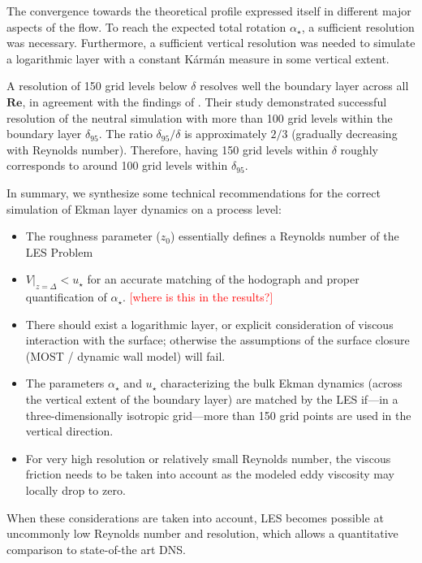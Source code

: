 \documentclass[a4paper,11pt]{article}
\newcommand{\todo}[1]{\textcolor{red}{$[$#1$]$}}
\newcommand{\RE}{\mathbf{Re}}
\begin{document}
The convergence towards the theoretical profile expressed itself in different major aspects of the flow. To reach the expected total rotation $\alpha_\star$, a sufficient resolution was necessary. Furthermore, a sufficient vertical resolution was needed to simulate a logarithmic layer with a constant K\'arm\'an measure in some vertical extent.

A resolution of 150 grid levels below $\delta$ resolves well the boundary layer across all $\RE$, in agreement with the findings of \cite{wurps2020grid}. Their study demonstrated successful resolution of the neutral simulation with more than 100 grid levels within the boundary layer $\delta_{95}$. The ratio $\delta_{95}/\delta$ is approximately $2/3$ (gradually decreasing with Reynolds number). Therefore, having 150 grid levels within $\delta$ roughly corresponds to around 100 grid levels within $\delta_{95}$.

In summary, we synthesize some technical recommendations for the correct simulation of Ekman layer dynamics on a process level:
\begin{itemize}
\item The roughness parameter ($z_0$) essentially defines a Reynolds number of the LES Problem
\item $V|_{z=\Delta} < u_\star$ for an accurate matching of the hodograph and proper quantification of $\alpha_\star$. \todo{where is this in the results?}
\item There should exist a logarithmic layer, or explicit consideration of viscous interaction with the surface; otherwise the assumptions of the surface closure (MOST / dynamic wall model) will fail.
\item The parameters $\alpha_\star$ and $u_\star$ characterizing the bulk Ekman dynamics (across the vertical extent of the boundary layer) are matched by the LES if---in a three-dimensionally isotropic grid---more than 150 grid points are used in the vertical direction.
\item For very high resolution or relatively small Reynolds number, the viscous friction needs to be taken into account as the modeled eddy viscosity may locally drop to zero.
\end{itemize}

When these considerations are taken into account, LES becomes possible at uncommonly low Reynolds number and resolution, which allows a quantitative comparison to state-of-the art DNS.
\end{document}
